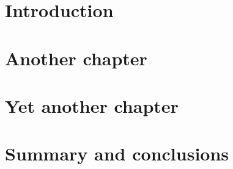 \chapter{Introduction}

\label{chapter:introduction}



\chapter{Another chapter}


\chapter{Yet another chapter}

\chapter{Summary and conclusions}


